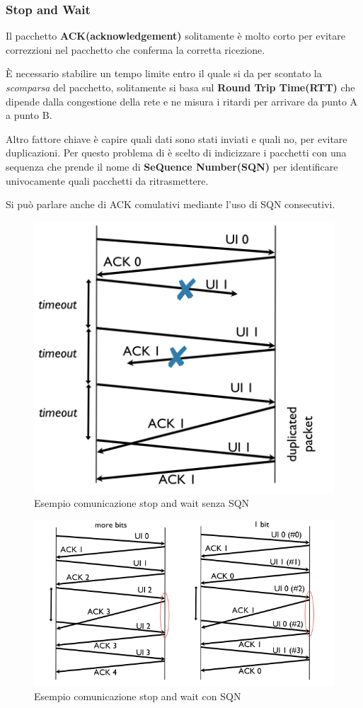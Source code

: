\subsubsection{Stop and Wait}

Il pacchetto \textbf{ACK(acknowledgement)} solitamente è molto corto per evitare
correzzioni nel pacchetto che conferma la corretta ricezione.

È necessario stabilire un tempo limite entro il quale si da per scontato
la \textit{scomparsa} del pacchetto, solitamente si basa sul \textbf{Round Trip Time(RTT)} che
dipende dalla congestione  della rete e ne misura i ritardi per arrivare da punto A a punto B.

Altro fattore chiave è capire quali dati sono stati inviati e quali no, per evitare
duplicazioni.
Per questo problema di è scelto di indicizzare i pacchetti con una sequenza che prende
il nome di \textbf{SeQuence Number(SQN)} per identificare univocamente quali pacchetti da ritrasmettere.

Si può parlare anche di ACK comulativi mediante l'uso di SQN consecutivi.

\begin{figure}[!ht]
	\centering
	\includegraphics[width=0.4\columnwidth]{./images/esempio_comunicazione_stop_wait_no_sqn.png}
	\caption{Esempio comunicazione stop and wait senza SQN}
	\label{fig:esempio_comunicazione_stop_wait_no_sqn}
\end{figure}


\begin{figure}[!ht]
	\centering
	\includegraphics[width=0.4\columnwidth]{./images/esempio_comunicazione_stop_wait_sqn.png}
	\caption{Esempio comunicazione stop and wait con SQN}
	\label{fig:esempio_comunicazione_stop_wait_sqn}
\end{figure}



